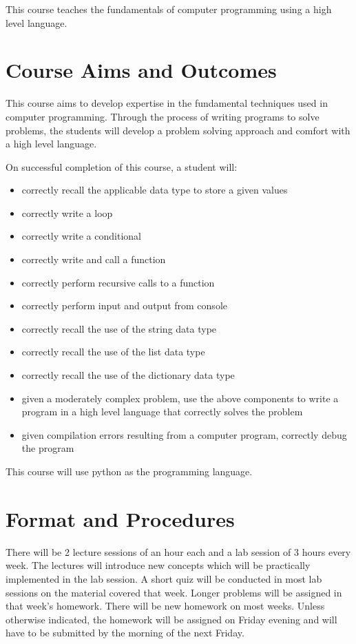 \documentclass[a4paper]{article}
\begin{document}
This course teaches the fundamentals of computer programming using a high level language.

\section{Course Aims and Outcomes}

This course aims to develop expertise in the fundamental techniques used in computer programming. Through the process of writing programs to solve problems, the students will develop a problem solving approach and comfort with a high level language.

On successful completion of this course, a student will:
\begin{itemize}
\item correctly recall the applicable data type to store a given values
\item correctly write a loop
\item correctly write a conditional
\item correctly write and call a function
\item correctly perform recursive calls to a function
\item correctly perform input and output from console
\item correctly recall the use of the string data type
\item correctly recall the use of the list data type
\item correctly recall the use of the dictionary data type
\item given a moderately complex problem, use the above components to write a program in a high level language that correctly solves the problem
\item given compilation errors resulting from a computer program, correctly debug the program
\end{itemize}
This course will use python as the programming language.

\section{Format and Procedures}

There will be 2 lecture sessions of an hour each and a lab session of 3 hours every week. The lectures will introduce new concepts which will be practically implemented in the lab session. A short quiz will be conducted in most lab sessions on the material covered that week. Longer problems will be assigned in that week's homework. There will be new homework on most weeks. Unless otherwise indicated, the homework will be assigned on Friday evening and will have to be submitted by the morning of the next Friday.
\end{document}
